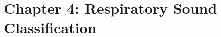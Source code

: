 \documentclass{report}
\begin{document}
\setcounter{chapter}{4}  %
\section*{Chapter 4:  Respiratory Sound Classification}







\end{document}

